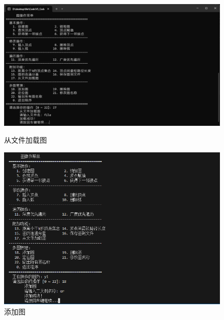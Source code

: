 \documentclass[supercite]{Experimental_Report}
\theoremstyle{definition}
\begin{document}
\begin{figure}[htb]
	\begin{center}
		\includegraphics[scale=0.30]{images/2-14.jpg}
		\caption{从文件加载图}
		\label{fig2-14}
	\end{center}

    \begin{center}
        \includegraphics[scale=0.30]{images/2-15.jpg}
        \caption{添加图}
        \label{fig2-15}
    \end{center}
\end{figure}
\end{document}
